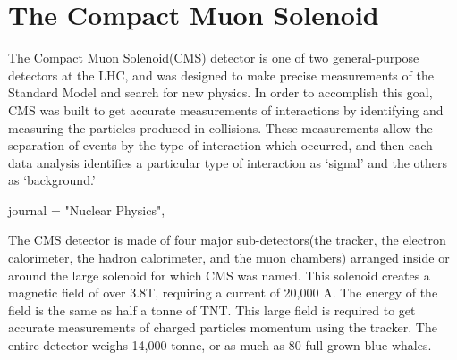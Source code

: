 \section{The Compact Muon Solenoid}
The Compact Muon Solenoid(CMS) detector is one of two general-purpose detectors at the LHC, and was designed to make precise measurements of the Standard Model and search for new physics. In order to accomplish this goal, CMS was built to get accurate measurements of interactions by identifying and measuring the particles produced in collisions. These measurements allow the separation of events by the type of interaction which occurred, and then each data analysis identifies a particular type of interaction as `signal' and the others as `background.'

    journal = "Nuclear Physics",

The CMS detector is made of four major sub-detectors(the tracker, the electron calorimeter, the hadron calorimeter, and the muon chambers) arranged inside or around the large solenoid for which CMS was named. This solenoid creates a magnetic field of over 3.8T, requiring a current of 20,000 A. The energy of the field is the same as half a tonne of TNT. This large field is required to get accurate measurements of charged particles momentum  using the tracker. The entire detector weighs 14,000-tonne, or as much as 80 full-grown blue whales.

